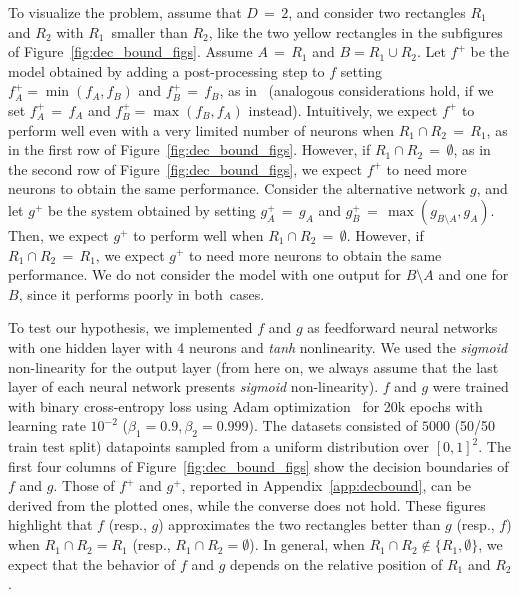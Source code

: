 \documentclass{article}
\begin{document}
To visualize the problem, assume that $D\,{=}\,2$, and consider two rectangles $R_1$ and $R_2$ with $R_1$~smal\-ler than $R_2$, like the two yellow rectangles in the subfigures of Figure~\ref{fig:dec_bound_figs}. Assume $A \,{=}\, R_1$ and $B = R_1 \cup R_2$.
Let $f^+$ be the model obtained by adding a post-processing step to $f$ setting $f^+_A=\min(f_A, f_B)$ and $f^+_B \,{=}\, f_B$, as in~\cite{cerri2014,cerri2016,feng2018} (analogous considerations hold, if we set $f^+_A\,{ =}\, f_A$ and $f^+_B = \max(f_B, f_A)$ instead). Intuitively, we expect $f^+$ to perform well even with a very limited number of neurons when $R_1 \cap R_2\,{ =}\, R_1$, as in the first row of Figure~\ref{fig:dec_bound_figs}.
However, if $R_1 \cap R_2 \,{=}\, \emptyset$, as in the second row of Figure~\ref{fig:dec_bound_figs}, we expect $f^+$ to need more neurons to obtain the same performance.
Consider the alternative network $g$, and
let $g^+$ be the system obtained by setting $g^+_A \,{=}\, g_A$ and $g^+_B \,{=}\, \max(g_{B\setminus A}, g_A)$.
Then, we expect $g^+$ to perform well when $R_1 \cap R_2 \,{=}\, \emptyset$.
However, if $R_1 \cap R_2\,{=}\, R_1$, we expect $g^+$ to need  more neurons to obtain the same performance. We do not consider the model with one output for $B\setminus A$ and one for $B$, since it performs poorly in both~cases.



To test our hypothesis, we implemented $f$ and $g$ as feedforward neural networks with one hidden layer with 4 neurons and {\sl tanh} nonlinearity. We used the {\sl sigmoid} non-linearity for the output layer (from here on, we always assume that the last layer of each neural network presents {\sl sigmoid} non-linearity). 
$f$ and $g$ were trained with binary cross-entropy loss using Adam optimization~\citep{kingma2014} for 20k epochs with learning rate $10^{-2}$ ($\beta_1 = 0.9, \beta_2 = 0.999$). The datasets consisted of $5000$ (50/50 train test split) datapoints sampled from a uniform distribution over $[0,1]^2$. 
The first four columns of Figure~\ref{fig:dec_bound_figs} show the decision boundaries of $f$ and $g$. Those of $f^+$ and $g^+$, reported in Appendix~\ref{app:decbound}, can be derived from the plotted ones, while the converse does not hold. These figures highlight that $f$ (resp., $g$) approximates the two rectangles better than $g$ (resp., $f$)  when $R_1 \cap R_2 = R_1$ (resp., $R_1 \cap R_2 = \emptyset$).
In general, when $R_1 \cap R_2 \not\in \{R_1,\emptyset\}$, we expect that the behavior  of $f$ and $g$ depends on the relative position of $R_1$ and $R_2$. 
\end{document}
